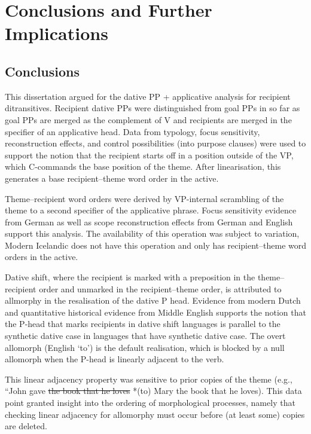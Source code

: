 \chapter{Conclusions and Further Implications}
\section{Conclusions}
This dissertation argued for the dative PP + applicative analysis for recipient ditransitives. Recipient dative PPs were distinguished from goal PPs in so far as goal PPs are merged as the complement of V and recipients are merged in the specifier of an applicative head. Data from typology, focus sensitivity, reconstruction effects, and control possibilities (into purpose clauses) were used to support the notion that the recipient starts off in a position outside of the VP, which C-commands the base position of the theme. After linearisation, this generates a base recipient--theme word order in the active.

Theme--recipient word orders were derived by VP-internal scrambling of the theme to a second specifier of the applicative phrase. Focus sensitivity evidence from German as well as scope reconstruction effects from German and English support this analysis. The availability of this operation was subject to variation, Modern Icelandic does not have this operation and only has recipient--theme word orders in the active. 

Dative shift, where the recipient is marked with a preposition in the theme--recipient order and unmarked in the recipient--theme order, is attributed to allmorphy in the resalisation of the dative P head. Evidence from modern Dutch and quantitative historical evidence from Middle English supports the notion that the P-head that marks recipients in dative shift languages is parallel to the synthetic dative case in languages that have synthetic dative case. The overt allomorph (English `to') is the default realisation, which is blocked by a null allomorph when the P-head is linearly adjacent to the verb.

This linear adjacency property was sensitive to prior copies of the theme (e.g., ``John gave \sout{the book that he loves} *(to) Mary the book that he loves). This data point granted insight into the ordering of morphological processes, namely that checking linear adjacency for allomorphy must occur before (at least some) copies are deleted.

